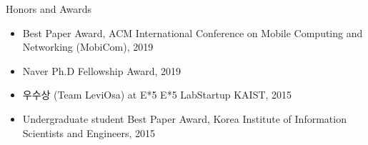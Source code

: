
\begin{rSection}{Honors and Awards}
  \begin{itemize}
  \item Best Paper Award, ACM International Conference on Mobile Computing and Networking (MobiCom), 2019
  \item Naver Ph.D Fellowship Award, 2019
  \item 우수상 (Team LeviOsa) at E*5 E*5 LabStartup KAIST, 2015
  \item Undergraduate student Best Paper Award, Korea Institute of Information Scientists and Engineers, 2015
  \end{itemize}
\end{rSection}
